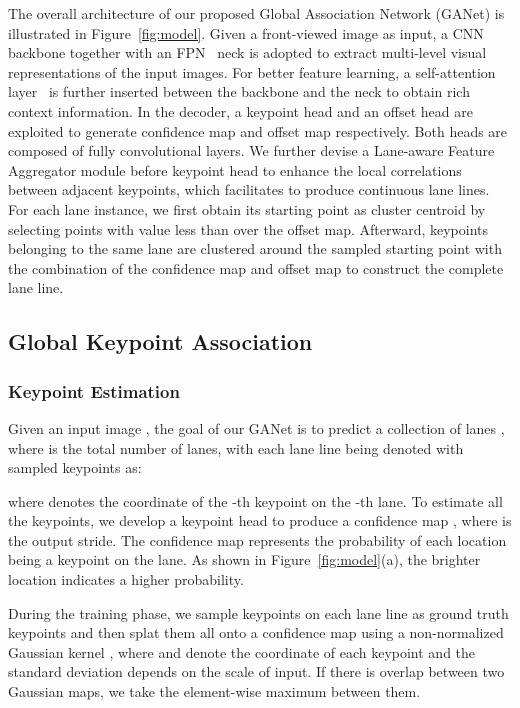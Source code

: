\documentclass[10pt,twocolumn,letterpaper]{article}
\begin{document}
The overall architecture of our proposed Global Association Network (GANet) is illustrated in Figure~\ref{fig:model}. 
Given a front-viewed image as input, a CNN backbone together with an FPN~\cite{lin2017feature} neck is adopted to extract multi-level visual representations of the input images. 
For better feature learning, a self-attention layer~\cite{vaswani2017attention} is further inserted between the backbone and the neck to obtain rich context information.
In the decoder, a keypoint head and an offset head are exploited to generate confidence map and offset map respectively. Both heads are composed of fully convolutional layers. We further devise a Lane-aware Feature Aggregator module before keypoint head to enhance the local correlations between adjacent keypoints, which facilitates to produce continuous lane lines.
For each lane instance, we first obtain its starting point as cluster centroid by selecting points with value less than  over the offset map.
Afterward, keypoints belonging to the same lane are clustered around the sampled starting point with the combination of the confidence map and offset map to construct the complete lane line.

\subsection{Global Keypoint Association}
\subsubsection{Keypoint Estimation}

Given an input image , the goal of our GANet is to predict a collection of lanes , where  is the total number of lanes, with each lane line being denoted with  sampled keypoints as:

where  denotes the coordinate of the -th keypoint on the -th lane.
To estimate all the keypoints, we develop a keypoint head to produce a confidence map , where  is the output stride. 
The confidence map represents the probability of each location being a keypoint on the lane.
As shown in Figure~\ref{fig:model}(a), the brighter location indicates a higher probability.

During the training phase, we sample  keypoints on each lane line as ground truth keypoints and then splat them all onto a confidence map  using a non-normalized Gaussian kernel , where  and  denote the coordinate of each keypoint and the standard deviation  depends on the scale of input. 
If there is overlap between two Gaussian maps, we take the element-wise maximum between them.
\end{document}
